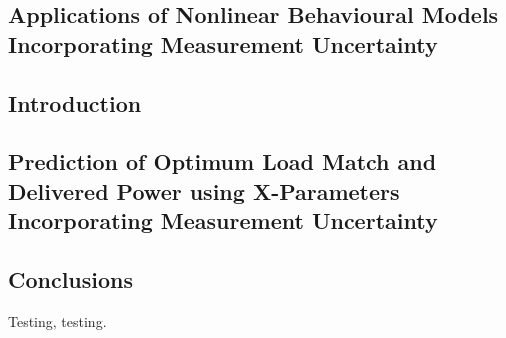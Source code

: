 \documentclass[../thesis/thesis.tex]{subfiles}
\begin{document}
\begin{refsection}
\chapter{Applications of Nonlinear Behavioural Models Incorporating Measurement Uncertainty}
\section{Introduction}
\lipsum
\section{Prediction of Optimum Load Match and Delivered Power using X-Parameters Incorporating Measurement Uncertainty}
\section{Conclusions}
Testing, testing\cite{Stant_2016_Coll, Stant_2016}.
\printbibliography
\end{refsection}
\end{document}
